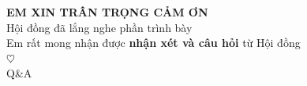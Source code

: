 \documentclass[aspectratio=43,xcolor=table]{beamer}
\newcommand{\highlight}[1]{\textcolor{hustred}{\textbf{#1}}}
\begin{document}
{
\begin{frame}[plain]
  \begin{center}
    \vspace{1.5cm}
    {\huge \textcolor{hustred}{\textbf{EM XIN TRÂN TRỌNG CẢM ƠN}}}\\[1cm]

    {\Large Hội đồng đã lắng nghe phần trình bày}\\[1.5cm]

    {\large Em rất mong nhận được \highlight{nhận xét và câu hỏi} từ Hội đồng}\\[2cm]

    {\Huge \textcolor{hustred}{$\heartsuit$}}\\
    {\Large \textcolor{hustdark}{Q\&A}}
  \end{center}
\end{frame}
}
\end{document}
